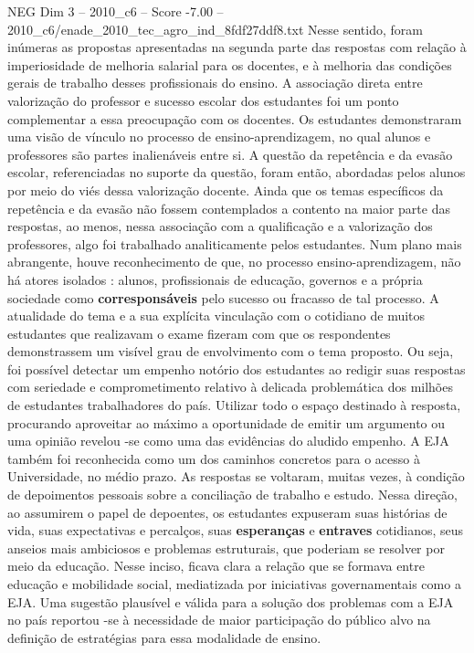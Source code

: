 \begin{textsample}{NEG Dim 3 – 2010\_c6 – Score -7.00 – 2010\_c6/enade\_2010\_tec\_agro\_ind\_8fdf27ddf8.txt}
Nesse sentido, foram inúmeras as propostas apresentadas na segunda parte das respostas com relação à imperiosidade de melhoria salarial para os docentes, e à melhoria das condições gerais de trabalho desses profissionais do ensino.
A associação direta entre valorização do professor e sucesso escolar dos estudantes foi um ponto complementar a essa preocupação com os docentes.
Os estudantes demonstraram uma visão de vínculo no processo de ensino-aprendizagem, no qual alunos e professores são partes inalienáveis entre si.
A questão da repetência e da evasão escolar, referenciadas no suporte da questão, foram então, abordadas pelos alunos por meio do viés dessa valorização docente.
Ainda que os temas específicos da repetência e da evasão não fossem contemplados a contento na maior parte das respostas, ao menos, nessa associação com a qualificação e a valorização dos professores, algo foi trabalhado analiticamente pelos estudantes.
Num plano mais abrangente, houve reconhecimento de que, no processo ensino-aprendizagem, não há atores isolados : alunos, profissionais de educação, governos e a própria sociedade como \textbf{corresponsáveis} pelo sucesso ou fracasso de tal processo.
A atualidade do tema e a sua explícita vinculação com o cotidiano de muitos estudantes que realizavam o exame fizeram com que os respondentes demonstrassem um visível grau de envolvimento com o tema proposto.
Ou seja, foi possível detectar um empenho notório dos estudantes ao redigir suas respostas com seriedade e comprometimento relativo à delicada problemática dos milhões de estudantes trabalhadores do país.
Utilizar todo o espaço destinado à resposta, procurando aproveitar ao máximo a oportunidade de emitir um argumento ou uma opinião revelou -se como uma das evidências do aludido empenho.
A EJA também foi reconhecida como um dos caminhos concretos para o acesso à Universidade, no médio prazo.
As respostas se voltaram, muitas vezes, à condição de depoimentos pessoais sobre a conciliação de trabalho e estudo.
Nessa direção, ao assumirem o papel de depoentes, os estudantes expuseram suas histórias de vida, suas expectativas e percalços, suas \textbf{esperanças} e \textbf{entraves} cotidianos, seus anseios mais ambiciosos e problemas estruturais, que poderiam se resolver por meio da educação.
Nesse inciso, ficava clara a relação que se formava entre educação e mobilidade social, mediatizada por iniciativas governamentais como a EJA.
Uma sugestão plausível e válida para a solução dos problemas com a EJA no país reportou -se à necessidade de maior participação do público alvo na definição de estratégias para essa modalidade de ensino.

\end{textsample}
